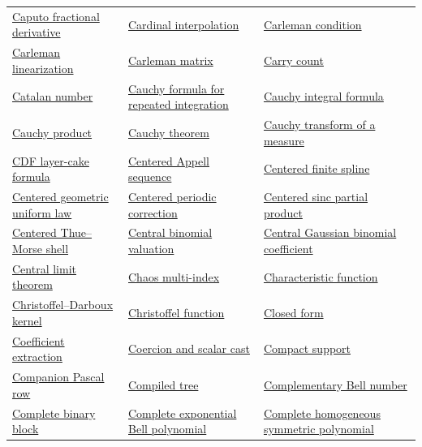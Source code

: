 \documentclass[11pt,oneside]{article}
\begin{document}
\begin{longtable}{L{0.31\textwidth}L{0.31\textwidth}L{0.31\textwidth}}
\hyperlink{gls:caputo-fractional-derivative}{Caputo fractional derivative} & \hyperlink{gls:cardinal-interpolation}{Cardinal interpolation} & \hyperlink{gls:carleman-condition}{Carleman condition} \\
\hyperlink{gls:carleman-linearization}{Carleman linearization} & \hyperlink{gls:carleman-matrix}{Carleman matrix} & \hyperlink{gls:carry-count}{Carry count} \\
\hyperlink{gls:catalan-number}{Catalan number} & \hyperlink{gls:cauchy-repeated-integration-formula}{Cauchy formula for repeated integration} & \hyperlink{gls:cauchy-integral-formula}{Cauchy integral formula} \\
\hyperlink{gls:cauchy-product}{Cauchy product} & \hyperlink{gls:cauchy-theorem}{Cauchy theorem} & \hyperlink{gls:cauchy-transform}{Cauchy transform of a measure} \\
\hyperlink{gls:cdf-layer-cake}{CDF layer-cake formula} & \hyperlink{gls:centered-appell-sequence}{Centered Appell sequence} & \hyperlink{gls:centered-finite-spline}{Centered finite spline} \\
\hyperlink{gls:centered-geometric-uniform-law}{Centered geometric uniform law} & \hyperlink{gls:centered-periodic-correction}{Centered periodic correction} & \hyperlink{gls:centered-sinc-partial-product}{Centered sinc partial product} \\
\hyperlink{gls:centered-thue-morse-shell}{Centered Thue--Morse shell} & \hyperlink{gls:central-binomial-valuation}{Central binomial valuation} & \hyperlink{gls:central-gaussian-binomial-coefficient}{Central Gaussian binomial coefficient} \\
\hyperlink{gls:central-limit-theorem}{Central limit theorem} & \hyperlink{gls:chaos-multi-index}{Chaos multi-index} & \hyperlink{gls:characteristic-function}{Characteristic function} \\
\hyperlink{gls:christoffel-darboux-kernel}{Christoffel--Darboux kernel} & \hyperlink{gls:christoffel-function}{Christoffel function} & \hyperlink{gls:closed-form}{Closed form} \\
\hyperlink{gls:coefficient-extraction}{Coefficient extraction} & \hyperlink{gls:coercion}{Coercion and scalar cast} & \hyperlink{gls:compact-support}{Compact support} \\
\hyperlink{gls:pascal-companion-row}{Companion Pascal row} & \hyperlink{gls:compiled-tree}{Compiled tree} & \hyperlink{gls:complementary-bell-number}{Complementary Bell number} \\
\hyperlink{gls:complete-binary-block}{Complete binary block} & \hyperlink{gls:complete-exponential-bell-polynomial}{Complete exponential Bell polynomial} & \hyperlink{gls:complete-homogeneous-symmetric-polynomial}{Complete homogeneous symmetric polynomial} \\

\end{longtable}
\end{document}
